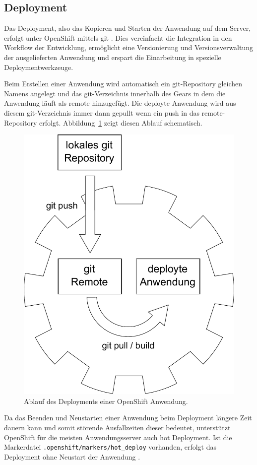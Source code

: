 \documentclass[10pt,a4paper,compsoc]{IEEEtran}
\begin{document}


\subsection{Deployment}
Das Deployment, also das Kopieren und Starten der Anwendung auf dem Server, erfolgt unter OpenShift mittels git \cite{git}. Dies vereinfacht die Integration in den Workflow der Entwicklung, ermöglicht eine Versionierung und Versionsverwaltung der ausgelieferten Anwendung und erspart die Einarbeitung in spezielle Deploymentwerkzeuge.

Beim Erstellen einer Anwendung wird automatisch ein git-Repository gleichen Namens angelegt und das git-Verzeichnis innerhalb des Gears in dem die Anwendung läuft als remote hinzugefügt. Die deployte Anwendung wird aus diesem git-Verzeichnis immer dann gepullt wenn ein push in das remote-Repository erfolgt. Abbildung~\ref{fig:deployment} zeigt diesen Ablauf schematisch.

\begin{figure}[htbp]
\centering
\includegraphics[width=0.7\linewidth]{imgs/deployment}
\caption{Ablauf des Deployments einer OpenShift Anwendung.}
\label{fig:deployment}
\end{figure}

Da das Beenden und Neustarten einer Anwendung beim Deployment längere Zeit dauern kann und somit störende Ausfallzeiten dieser bedeutet, unterstützt OpenShift für die meisten An\-wen\-dungs\-ser\-ver auch hot Deployment. Ist die Markerdatei \verb!.openshift/markers/hot_deploy! vorhanden, erfolgt das Deployment ohne Neustart der Anwendung \cite[S.40f]{os_user_guide}.
\end{document}
